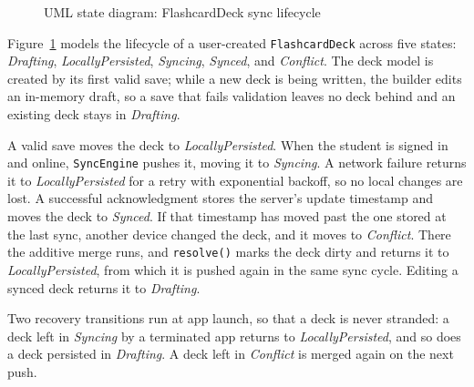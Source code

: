 \documentclass[12pt,letterpaper]{article}
\begin{document}
\begin{figure}[!htbp]
\caption{UML state diagram: FlashcardDeck sync lifecycle}
\label{fig:state}
\end{figure}

Figure~\ref{fig:state} models the lifecycle of a user-created \texttt{FlashcardDeck}
across five states: \emph{Drafting}, \emph{LocallyPersisted}, \emph{Syncing},
\emph{Synced}, and \emph{Conflict}. The deck model is created by its first valid save;
while a new deck is being written, the builder edits an in-memory draft, so a save that
fails validation leaves no deck behind and an existing deck stays in \emph{Drafting}.

A valid save moves the deck to \emph{LocallyPersisted}. When the student is signed in
and online, \texttt{SyncEngine} pushes it, moving it to \emph{Syncing}. A network
failure returns it to \emph{LocallyPersisted} for a retry with exponential backoff, so
no local changes are lost. A successful acknowledgment stores the server's update
timestamp and moves the deck to \emph{Synced}. If that timestamp has moved past the one
stored at the last sync, another device changed the deck, and it moves to
\emph{Conflict}. There the additive merge runs, and \texttt{resolve()} marks the deck
dirty and returns it to \emph{LocallyPersisted}, from which it is pushed again in the
same sync cycle. Editing a synced deck returns it to \emph{Drafting}.

Two recovery transitions run at app launch, so that a deck is never stranded: a deck
left in \emph{Syncing} by a terminated app returns to \emph{LocallyPersisted}, and so
does a deck persisted in \emph{Drafting}. A deck left in \emph{Conflict} is merged
again on the next push.
\end{document}
